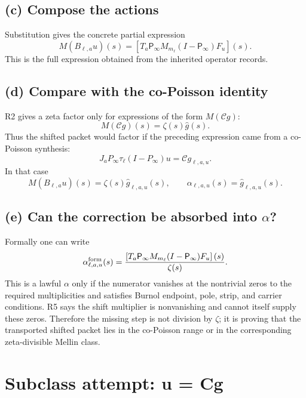 \documentclass[11pt]{article}
\newcommand{\Pinfty}{P_{\infty}}
\newcommand{\Pinfm}{\mathsf P_{\infty}}
\newcommand{\Mell}{M}
\newcommand{\Chat}{\mathcal C}
\newcommand{\zetaF}{\zeta}
\begin{document}
\subsection*{(c) Compose the actions}

Substitution gives the concrete partial expression
\[
\boxed{
  \Mell(B_{\ell,a}u)(s)
  =
  \left[
  T_a\Pinfm M_{m_\ell}(I-\Pinfm)F_u
  \right](s).
}
\]
This is the full expression obtained from the inherited operator records.

\subsection*{(d) Compare with the co-Poisson identity}

R2 gives a zeta factor only for expressions of the form \(\Mell(\Chat g)\):
\[
  \Mell(\Chat g)(s)=\zetaF(s)\widehat g(s).
\]
Thus the shifted packet would factor if the preceding expression came from a
co-Poisson synthesis:
\[
  J_a\Pinfty\tau_\ell(I-\Pinfty)u=\Chat g_{\ell,a,u}.
\]
In that case
\[
  \Mell(B_{\ell,a}u)(s)
  =
  \zetaF(s)\widehat g_{\ell,a,u}(s),
\qquad
  \alpha_{\ell,a,u}(s)=\widehat g_{\ell,a,u}(s).
\]

\subsection*{(e) Can the correction be absorbed into \(\alpha\)?}

Formally one can write
\[
  \alpha_{\ell,a,u}^{\rm form}(s)
  =
  \frac{\left[T_a\Pinfm M_{m_\ell}(I-\Pinfm)F_u\right](s)}{\zetaF(s)}.
\]
This is a lawful \(\alpha\) only if the numerator vanishes at the nontrivial
zeros to the required multiplicities and satisfies Burnol endpoint, pole, strip,
and carrier conditions. R5 says the shift multiplier is nonvanishing and cannot
itself supply these zeros. Therefore the missing step is not division by
\(\zeta\); it is proving that the transported shifted packet lies in the
co-Poisson range or in the corresponding zeta-divisible Mellin class.

\section{Subclass attempt: u = Cg}
\end{document}
